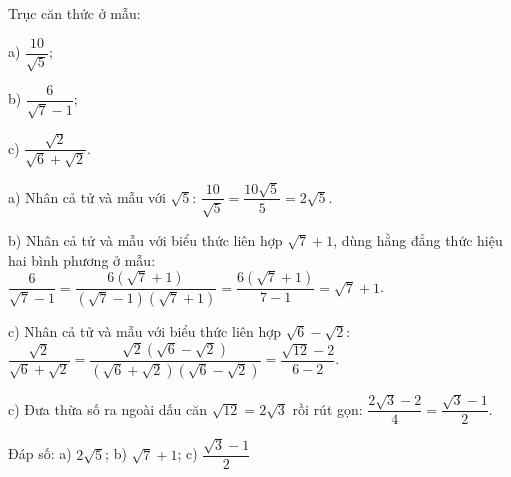 \begin{problem}[9DS-CAN-037]
Trục căn thức ở mẫu:

a) $\dfrac{10}{\sqrt{5}}$;

b) $\dfrac{6}{\sqrt{7} - 1}$;

c) $\dfrac{\sqrt{2}}{\sqrt{6} + \sqrt{2}}$.

\begin{solution}
a) Nhân cả tử và mẫu với $\sqrt{5}$: $\dfrac{10}{\sqrt{5}} = \dfrac{10\sqrt{5}}{5} = 2\sqrt{5}$.

b) Nhân cả tử và mẫu với biểu thức liên hợp $\sqrt{7} + 1$, dùng hằng đẳng thức hiệu hai bình phương ở mẫu: $\dfrac{6}{\sqrt{7} - 1} = \dfrac{6(\sqrt{7} + 1)}{(\sqrt{7} - 1)(\sqrt{7} + 1)} = \dfrac{6(\sqrt{7} + 1)}{7 - 1} = \sqrt{7} + 1$.

c) Nhân cả tử và mẫu với biểu thức liên hợp $\sqrt{6} - \sqrt{2}$: $\dfrac{\sqrt{2}}{\sqrt{6} + \sqrt{2}} = \dfrac{\sqrt{2}(\sqrt{6} - \sqrt{2})}{(\sqrt{6} + \sqrt{2})(\sqrt{6} - \sqrt{2})} = \dfrac{\sqrt{12} - 2}{6 - 2}$.

c) Đưa thừa số ra ngoài dấu căn $\sqrt{12} = 2\sqrt{3}$ rồi rút gọn: $\dfrac{2\sqrt{3} - 2}{4} = \dfrac{\sqrt{3} - 1}{2}$.

Đáp số: a) $\boxed{2\sqrt{5}}$; b) $\boxed{\sqrt{7} + 1}$; c) $\boxed{\dfrac{\sqrt{3} - 1}{2}}$
\end{solution}
\end{problem}

